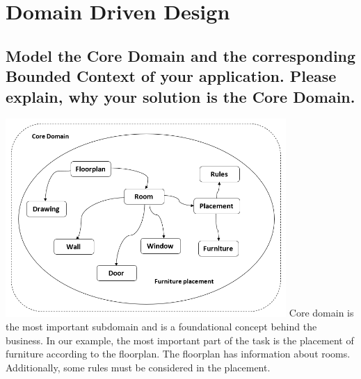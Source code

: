 \section{Domain Driven Design}
	
		\subsection{Model the Core Domain and the corresponding Bounded Context of your
			application. Please explain, why your solution is the Core Domain.}
			\includegraphics[keepaspectratio,width=0.8\textwidth,angle=0]{images/ddd1.PNG}
			\newline
			Core domain is the most important subdomain and is a foundational concept behind the business.
            In our example, the most important part of the task is the placement of furniture according to the floorplan. The floorplan has information about rooms. Additionally, some rules must be considered in the placement.
            
